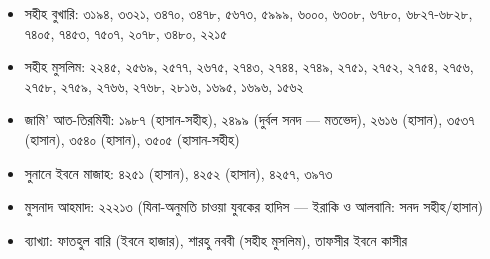 \begin{itemize}
\item সহীহ বুখারি: ৩১৯৪, ৩৩২১, ৩৪৭০, ৩৪৭৮, ৫৬৭৩, ৫৯৯৯, ৬০০০, ৬৩০৮, ৬৭৮০, ৬৮২৭-৬৮২৮, ৭৪০৫, ৭৪৫৩, ৭৫০৭, ২০৭৮, ৩৪৮০, ২২১৫
\item সহীহ মুসলিম: ২২৪৫, ২৫৬৯, ২৫৭৭, ২৬৭৫, ২৭৪৩, ২৭৪৪, ২৭৪৯, ২৭৫১, ২৭৫২, ২৭৫৪, ২৭৫৬, ২৭৫৮, ২৭৫৯, ২৭৬৬, ২৭৬৮, ২৮১৬, ১৬৯৫, ১৬৯৬, ১৫৬২
\item জামি' আত-তিরমিযী: ১৯৮৭ (হাসান-সহীহ), ২৪৯৯ (দুর্বল সনদ — মতভেদ), ২৬১৬ (হাসান), ৩৫৩৭ (হাসান), ৩৫৪০ (হাসান), ৩৫০৫ (হাসান-সহীহ)
\item সুনানে ইবনে মাজাহ: ৪২৫১ (হাসান), ৪২৫২ (হাসান), ৪২৫৭, ৩৯৭৩
\item মুসনাদ আহমাদ: ২২২১৩ (যিনা-অনুমতি চাওয়া যুবকের হাদিস — ইরাকি ও আলবানি: সনদ সহীহ/হাসান)
\item ব্যাখ্যা: ফাতহুল বারি (ইবনে হাজার), শারহু নববী (সহীহ মুসলিম), তাফসীর ইবনে কাসীর
\end{itemize}


